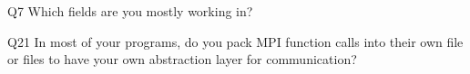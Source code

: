 \begin{description}%
\item{Q7} Which fields are you mostly working in?%
\item{Q21} In most of your programs, do you pack MPI function calls into their own file or files to have your own abstraction layer for communication?%
\end{description}%
